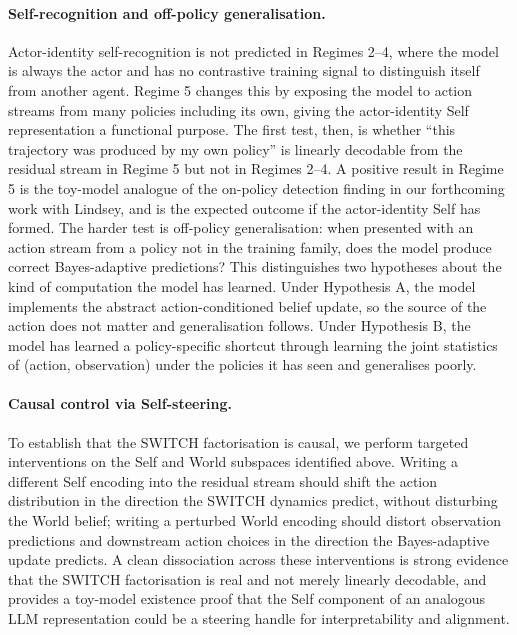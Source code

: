 \documentclass[11pt]{article}
\begin{document}
\paragraph{Self-recognition and off-policy generalisation.} Actor-identity self-recognition is not predicted in Regimes 2--4, where the model is always the actor and has no contrastive training signal to distinguish itself from another agent. Regime 5 changes this by exposing the model to action streams from many policies including its own, giving the actor-identity Self representation a functional purpose. The first test, then, is whether ``this trajectory was produced by my own policy'' is linearly decodable from the residual stream in Regime 5 but not in Regimes 2--4. A positive result in Regime 5 is the toy-model analogue of the on-policy detection finding in our forthcoming work with Lindsey, and is the expected outcome if the actor-identity Self has formed. The harder test is off-policy generalisation: when presented with an action stream from a policy not in the training family, does the model produce correct Bayes-adaptive predictions? This distinguishes two hypotheses about the kind of computation the model has learned. Under Hypothesis A, the model implements the abstract action-conditioned belief update, so the source of the action does not matter and generalisation follows. Under Hypothesis B, the model has learned a policy-specific shortcut through learning the joint statistics of (action, observation) under the policies it has seen and generalises poorly.

\paragraph{Causal control via Self-steering.} To establish that the SWITCH factorisation is causal, we perform targeted interventions on the Self and World subspaces identified above. Writing a different Self encoding into the residual stream should shift the action distribution in the direction the SWITCH dynamics predict, without disturbing the World belief; writing a perturbed World encoding should distort observation predictions and downstream action choices in the direction the Bayes-adaptive update predicts. A clean dissociation across these interventions is strong evidence that the SWITCH factorisation is real and not merely linearly decodable, and provides a toy-model existence proof that the Self component of an analogous LLM representation could be a steering handle for interpretability and alignment.
\end{document}
